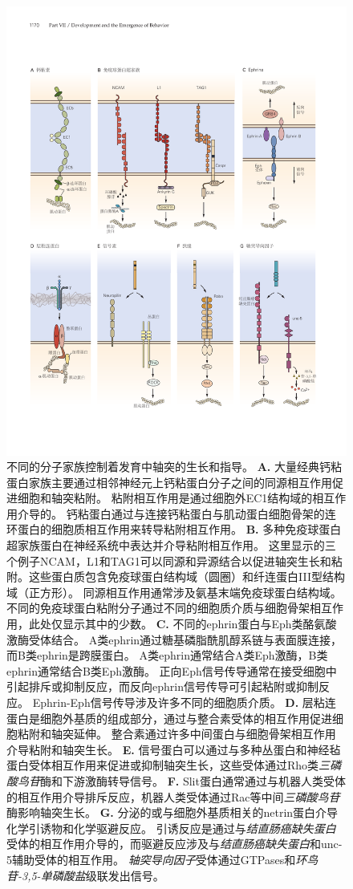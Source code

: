 \begin{figure}[htbp]
	\centering
	\includegraphics[width=0.85\linewidth]{chap47/fig_47_11}
	\caption{不同的分子家族控制着发育中轴突的生长和指导。
		\textbf{A.} 大量经典钙粘蛋白家族主要通过相邻神经元上钙粘蛋白分子之间的同源相互作用促进细胞和轴突粘附。
		粘附相互作用是通过细胞外EC1结构域的相互作用介导的。
		钙粘蛋白通过与连接钙粘蛋白与肌动蛋白细胞骨架的连环蛋白的细胞质相互作用来转导粘附相互作用。
		\textbf{B.} 多种免疫球蛋白超家族蛋白在神经系统中表达并介导粘附相互作用。
		这里显示的三个例子NCAM，L1和TAG1可以同源和异源结合以促进轴突生长和粘附。这些蛋白质包含免疫球蛋白结构域（圆圈）和纤连蛋白III型结构域（正方形）。
		同源相互作用通常涉及氨基末端免疫球蛋白结构域。
		不同的免疫球蛋白粘附分子通过不同的细胞质介质与细胞骨架相互作用，此处仅显示其中的少数。
		\textbf{C.} 不同的ephrin蛋白与Eph类酪氨酸激酶受体结合。
		A类ephrin通过糖基磷脂酰肌醇系链与表面膜连接，而B类ephrin是跨膜蛋白。
		A类ephrin通常结合A类Eph激酶，B类ephrin通常结合B类Eph激酶。
		正向Eph信号传导通常在接受细胞中引起排斥或抑制反应，而反向ephrin信号传导可引起粘附或抑制反应。
		Ephrin-Eph信号传导涉及许多不同的细胞质介质。
		\textbf{D.} 层粘连蛋白是细胞外基质的组成部分，通过与整合素受体的相互作用促进细胞粘附和轴突延伸。
		整合素通过许多中间蛋白与细胞骨架相互作用介导粘附和轴突生长。
		\textbf{E.} 信号蛋白可以通过与多种丛蛋白和神经毡蛋白受体相互作用来促进或抑制轴突生长，这些受体通过Rho类\textit{三磷酸鸟苷}酶和下游激酶转导信号。
		\textbf{F.} Slit蛋白通常通过与机器人类受体的相互作用介导排斥反应，机器人类受体通过Rac等中间\textit{三磷酸鸟苷}酶影响轴突生长。
		\textbf{G.} 分泌的或与细胞外基质相关的netrin蛋白介导化学引诱物和化学驱避反应。
		引诱反应是通过与\textit{结直肠癌缺失蛋白}受体的相互作用介导的，而驱避反应涉及与\textit{结直肠癌缺失蛋白}和unc-5辅助受体的相互作用。
		\textit{轴突导向因子}受体通过GTPases和\textit{环鸟苷-3,5-单磷酸盐}级联发出信号。}
	\label{fig:47_11}
\end{figure}


